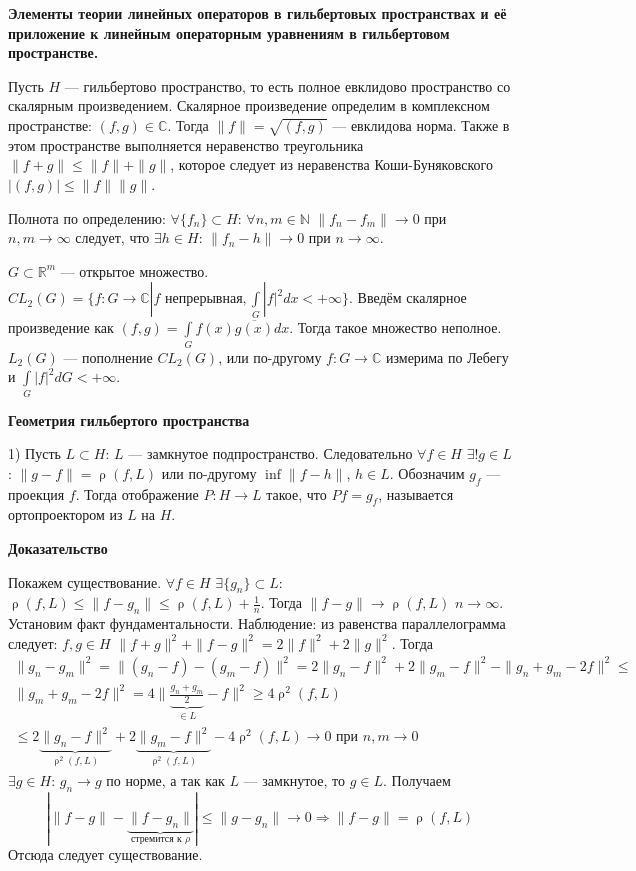 \documentclass[12pt]{article}
\DeclareMathOperator{\rh}{\rho}
\begin{document}
\begin{center}
\textbf{Элементы теории линейных операторов в гильбертовых пространствах и её приложение к линейным операторным уравнениям в гильбертовом пространстве.}
\end{center}

Пусть $H$ --- гильбертово пространство, то есть полное евклидово пространство со скалярным произведением.
Скалярное произведение определим в комплексном пространстве: $(f,g)\in \mathbb C$.
Тогда $\|f\|=\sqrt{(f,g)}$ --- евклидова норма.
Также в этом пространстве выполняется неравенство треугольника $\|f+g\|\le\|f\|+\|g\|$, которое следует из неравенства Коши-Буняковского $|(f,g)|\le\|f\|\|g\|$.

Полнота по определению: $\forall \{f_n\}\subset H$: $\forall n,m\in\mathbb N$ $\|f_n-f_m\|\to0$ при $n,m\to\infty$ следует, что $\exists h \in H$: $\|f_n-h\|\to0$ при $n\to\infty$.

$G\subset\mathbb R^m$ --- открытое множество.
$CL_2(G)=\{f:G\to\mathbb C|f\text{ непрерывная}, \int\limits_G|f|^2 dx<+\infty\}$.
Введём скалярное произведение как $(f,g)=\int\limits_G f(x)\overline{g(x)} dx$. Тогда такое множество неполное.
$L_2(G)$ --- пополнение $CL_2(G)$, или по-другому $f:G\to\mathbb C$ измерима по Лебегу и $\int\limits_G|f|^2 dG<+\infty$.
\begin{center}
\textbf{Геометрия гильбертого пространства}
\end{center}

1) Пусть $L\subset H$: $L$ --- замкнутое подпространство.
Следовательно $\forall f\in H$ $\exists! g\in L$: $\|g-f\|=\rh(f,L)$ или по-другому $\inf\|f-h\|$, $h\in L$.
Обозначим $g_f$ --- проекция $f$.
Тогда отображение $P:H\to L$ такое, что $Pf=g_f$, называется ортопроектором из $L$ на $H$.

\textbf{Доказательство}

Покажем существование.
$\forall f\in H$ $\exists \{g_n\}\subset L$: $\rh(f,L)\le \|f-g_n\|\le\rh(f,L)+\frac{1}{n}$.
Тогда $\|f-g\|\to\rh(f,L)$ $n\to\infty$.
Установим факт фундаментальности.
Наблюдение: из равенства параллелограмма следует: $f, g\in H$ $\|f+g\|^2+\|f-g\|^2=2\|f\|^2+2\|g\|^2$.
Тогда
\begin{gather*}
\|g_n-g_m\|^2=\|(g_n-f)-(g_m-f)\|^2=2\|g_n-f\|^2+2\|g_m-f\|^2-\|g_n+g_m-2f\|^2\boxed{\le}\\
\|g_m+g_m-2f\|^2=4\|\underbrace{\frac{g_n+g_m}2}_{\in L}-f\|^2\ge4\rh^2(f,L)\\
\boxed{\le}2\underbrace{\|g_n-f\|^2}_{\rh^2(f,L)}+2\underbrace{\|g_m-f\|^2}_{\rh^2(f,L)}-4\rh^2(f,L)\to0\text{ при }n,m\to0
\end{gather*}
$\exists g\in H$: $g_n\to  g$ по норме, а так как $L$ --- замкнутое, то $g\in L$.
Получаем 
$$
|\|f-g\|-\underbrace{\|f-g_n\|}_{\text{стремится к }\rho}|\le\|g-g_n\|\to0\Rightarrow\|f-g\|=\rh(f,L)
$$
Отсюда следует существование.
\end{document}
